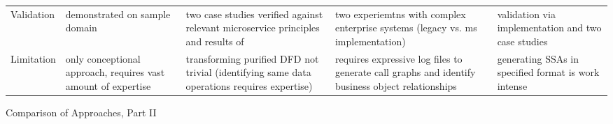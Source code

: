 {\begin{landscape}
\begin{threeparttable}[h!]
\begin{tabularx}{\linewidth}{XXXXX}
				Validation & demonstrated on sample domain& two case studies verified against relevant microservice principles and results of \cite{ServiceCutter} & two experiemtns with complex enterprise systems (legacy vs. ms implementation) & validation via implementation and two case studies\\
				
				Limitation & only conceptional approach, requires vast amount of expertise & transforming purified DFD not trivial (identifying same data operations requires expertise)& requires expressive log files to generate call graphs and identify business object relationships& generating SSAs in specified format is work intense  \\
				
			\end{tabularx}
			\caption{Comparison of Approaches, Part II}
			\label{tab:compareApproaches2}
			
			
			
		\end{threeparttable}
		
		
		
	\end{landscape}
	\clearpage%
}




























